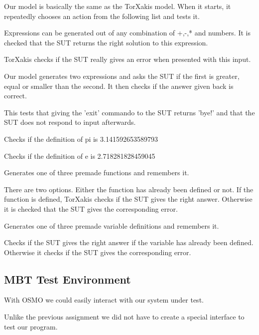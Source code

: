 \documentclass[11pt,a4paper]{article}
\begin{document}
Our model is basically the same as the TorXakis model. When it starts, it repeatedly chooses an action from the following list and tests it.
\begin{description}[labelindent=1cm]
	\item[\textbf{Expression}] Expressions can be generated out of any combination of +,-,* and numbers. It is checked that the SUT returns the right solution to this expression.
	\item[\textbf{1/0}] TorXakis checks if the SUT really gives an error when presented with this input.
	\item[\textbf{equality}] Our model generates two expressions and asks the SUT if the first is greater, equal or smaller than the second. It then checks if the answer given back is correct.
	\item[\textbf{exit}] This tests that giving the 'exit' commando to the SUT returns 'bye!' and that the SUT does not respond to input afterwards.
	\item[\textbf{pi}] Checks if the definition of pi is 3.141592653589793
	\item[\textbf{e}] Checks if the definition of e is 2.718281828459045
	\item[\textbf{function definition}] Generates one of three premade functions and remembers it.
	\item[\textbf{function application}] There are two options. Either the function has already been defined or not. If the function is defined, TorXakis checks if the SUT gives the right answer. Otherwise it is checked that the SUT gives the corresponding error.
	\item[\textbf{variable definition}] Generates one of three premade variable definitions and remembers it.
	\item[\textbf{variable application}] Checks if the SUT gives the right answer if the variable has already been defined. Otherwise it checks if the SUT gives the corresponding error.
\end{description}



\subsection{MBT Test Environment}
With OSMO we could easily interact with our system under test.

Unlike the previous assignment we did not have to create a special
interface to test our program.
\end{document}
